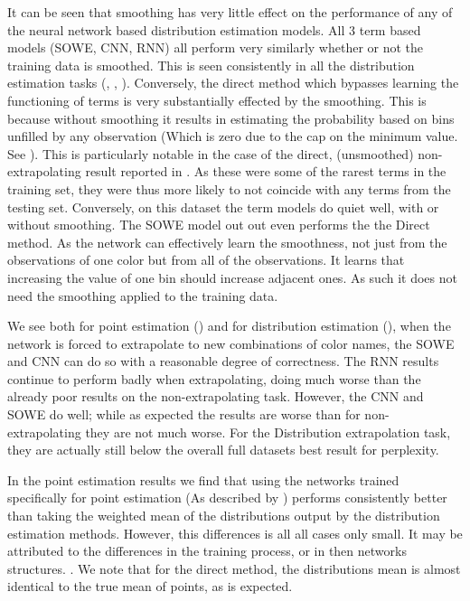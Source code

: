 \documentclass[11pt,a4paper]{article}
\begin{document}
It can be seen that smoothing has very little effect on the performance of any of the neural network based distribution estimation models.
All 3 term based models (SOWE, CNN, RNN) all perform very similarly whether or not the training data is smoothed.
This is seen consistently in all the distribution estimation tasks  (, , ).
Conversely, the direct method which bypasses learning the functioning of terms is very substantially effected by the smoothing.
This is because without smoothing it results in estimating the probability based on bins unfilled by any observation (Which is zero due to the cap on the minimum value. See ).
This is particularly notable in the case of the direct, (unsmoothed) non-extrapolating result reported in . As these were some of the rarest terms in the training set, they were thus more likely to not coincide with any terms from the testing set.
Conversely, on this dataset the term models do quiet well, with or without smoothing. The SOWE model out out even performs the the Direct method.
As the network can effectively learn the smoothness, not just from the observations of one color but from all of the observations.
It learns that increasing the value of one bin should increase adjacent ones.
As such it does not need the smoothing applied to the training data.

We see both for point estimation () and for distribution estimation (), when the network is forced to extrapolate to new combinations of color names, the SOWE and CNN can do so with a reasonable degree of correctness.
The RNN results continue to perform badly when extrapolating, doing much worse than the already poor results on the non-extrapolating task.
However, the CNN and SOWE do well; while as expected the results are worse than for non-extrapolating they are not much worse.
For the Distribution extrapolation task, they are actually still below the overall full datasets best result for perplexity.

In the point estimation results we find that using the networks trained specifically for point estimation (As described by ) performs consistently better than taking the weighted mean of the distributions output by the distribution estimation methods.
However, this differences is all all cases only small.
It may be attributed to the differences in the training process, or in then networks structures.
.
We note that for the direct method, the distributions mean is almost identical to the true mean of points, as is expected.
\end{document}
